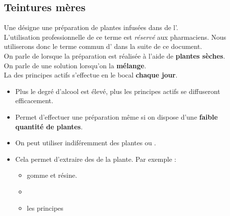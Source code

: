 \subsection{Teintures mères}

\begin{Defi}

    Une  désigne une préparation de plantes infusées dans de l'. \\
    L'utilisation professionnelle de ce terme est \textit{réservé} aux pharmaciens. Nous utiliserons donc le terme commun d' dans la suite de ce document.\\

    On parle de  lorsque la préparation est réalisée à l'aide de \textbf{plantes sèches}.\\

    On parle de  une solution lorsqu'on la \textbf{mélange}.\\

    La  des principes actifs s'effectue en  le bocal \textbf{chaque jour}. 
\end{Defi}
\begin{Remarque}[]%

    \begin{itemize}[label=\faPen]
        \item Plus le degré d'alcool est élevé, plus les principes actifs se diffuseront efficacement. 
        \item Permet d'effectuer une préparation même si on dispose d'une \textbf{faible quantité de plantes}. 
        \item On peut utiliser indiféremment des plantes  ou .
        \item Cela permet d'extraire des   de la plante. Par exemple :
                \begin{multicols}{3}
                    \begin{itemize}
                        \item gomme et résine.
                        \item {} 
                        \item les principes 
                    \end{itemize}
                \end{multicols}
    \end{itemize}
\end{Remarque}
